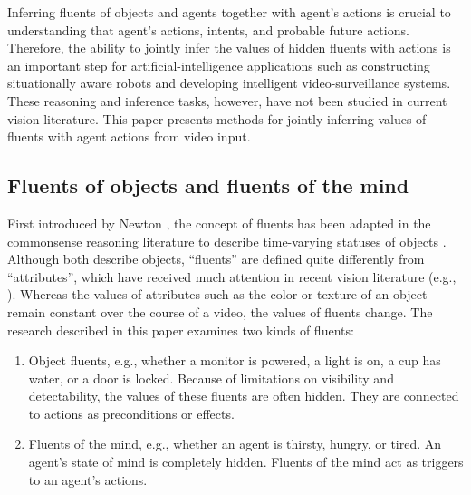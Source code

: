 \documentclass[10pt,journal,letterpaper,compsoc]{IEEEtran}
\begin{document}

Inferring fluents of objects and agents together with agent's actions is crucial to understanding that agent's actions, intents, and probable future actions.  Therefore, the ability to jointly infer the values of hidden fluents with actions is an important step for artificial-intelligence applications such as constructing situationally aware robots and developing intelligent video-surveillance systems.  These reasoning and inference tasks, however, have not been studied in current vision literature. This paper presents methods for jointly inferring values of fluents with agent actions from video input.



\subsection{Fluents of objects and fluents of the mind}

First introduced by Newton \cite{Newton}, the concept of fluents has been adapted in the commonsense reasoning literature to describe time-varying statuses of objects \cite{CommonsenseReasoning}.  Although both describe objects, ``fluents'' are defined quite differently from ``attributes'', which have received much attention in recent vision literature (e.g., \cite{lampert2009learning}).  Whereas the values of attributes such as the color or texture of an object remain constant over the course of a video, the values of fluents change.   The research described in this paper examines two kinds of fluents: 
\begin{enumerate}
\item Object fluents, e.g., whether a monitor is powered, a light is on, a cup has water, or a door is locked.   Because of limitations on visibility and detectability, the values of these fluents are often hidden.  They are connected to actions as preconditions or effects.  
\item Fluents of the mind, e.g., whether an agent is thirsty, hungry, or tired.  An agent's state of mind is completely hidden.  Fluents of the mind act as triggers to an agent's actions.
\end{enumerate}
\end{document}
